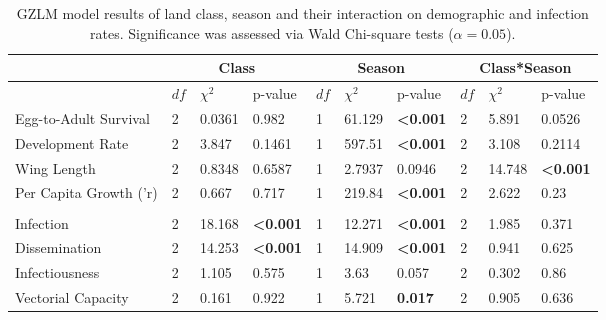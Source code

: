 \documentclass[12pt]{article}
\begin{document}
\begin{table}[h!]

\caption{GZLM model results of land class, season and their interaction on demographic and infection rates. Significance was assessed via Wald Chi-square tests ($\alpha=0.05$).}
      \begin{tabular}{|l|lll|lll|lll|}
      \hline
                       & \multicolumn{3}{c|}{\textbf{Class}}    & \multicolumn{3}{c|}{\textbf{Season}}   & \multicolumn{3}{c|}{\textbf{Class*Season}} \\  \hline
                       & $df$ & $\chi^2$  & p-value                 & $df$ & $\chi^2$  & p-value                 & $df$   & $\chi^2$   & p-value                  \\ \hline
Egg-to-Adult Survival               & 2  & 0.0361 & 0.982                   & 1  & 61.129 & \textbf{\textless0.001} & 2    & 5.891   & 0.0526                   \\
Development Rate       & 2  & 3.847  & 0.1461                  & 1  & 597.51 & \textbf{\textless0.001} & 2    & 3.108   & 0.2114                   \\
Wing Length            & 2  & 0.8348 & 0.6587                  & 1  & 2.7937 & 0.0946                  & 2    & 14.748  & \textbf{\textless0.001}  \\
Per Capita Growth ('r) & 2  & 0.667  & 0.717                   & 1  & 219.84 & \textbf{\textless0.001} & 2    & 2.622   & 0.23                     \\
                       &    &        &                         &    &        &                         &      &         &                          \\
Infection              & 2  & 18.168 & \textbf{\textless0.001} & 1  & 12.271 & \textbf{\textless0.001} & 2    & 1.985   & 0.371                    \\
Dissemination          & 2  & 14.253 & \textbf{\textless0.001} & 1  & 14.909 & \textbf{\textless0.001} & 2    & 0.941   & 0.625                    \\
Infectiousness         & 2  & 1.105  & 0.575                   & 1  & 3.63   & 0.057                   & 2    & 0.302   & 0.86                     \\
Vectorial Capacity     & 2  & 0.161  & 0.922                   & 1  & 5.721  & \textbf{0.017}          & 2    & 0.905   & 0.636 \\ \hline
\end{tabular}
  \label{table:modelResults}
\end{table}
\end{document}
